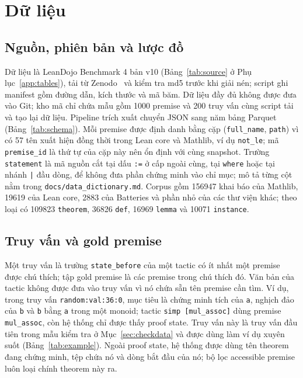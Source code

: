 \documentclass[11pt,a4paper,oneside]{report}
\newcommand{\code}[1]{\texttt{#1}}
\begin{document}
\chapter{Dữ liệu}\label{sec:data}

\section{Nguồn, phiên bản và lược đồ}

Dữ liệu là LeanDojo Benchmark 4 bản v10 (Bảng~\ref{tab:source} ở Phụ lục~\ref{app:tables}), tải từ
Zenodo~\cite{zenodo2024} và kiểm tra md5 trước khi giải nén; script ghi manifest gồm đường dẫn, kích thước và mã băm. Dữ
liệu đầy đủ không được đưa vào Git; kho mã chỉ chứa mẫu gồm \num{1000} premise và 200 truy vấn cùng script tải và tạo lại
dữ liệu. Pipeline trích xuất chuyển JSON sang năm bảng Parquet (Bảng~\ref{tab:schema}). Mỗi premise được định danh bằng cặp
(\code{full\_name}, \code{path}) vì có 57 tên xuất hiện đồng thời trong Lean core và Mathlib, ví dụ \code{not\_le}; mã
\code{premise\_id} là thứ tự của cặp này nên ổn định với cùng snapshot. Trường \code{statement} là mã nguồn cắt tại dấu
\code{:=} ở cấp ngoài cùng, tại \code{where} hoặc tại nhánh \code{|} đầu dòng, để không đưa phần chứng minh vào chỉ mục;
mô tả từng cột nằm trong \code{docs/data\_dictionary.md}. Corpus gồm \num{156947} khai báo của Mathlib, \num{19619} của Lean
core, \num{2883} của Batteries và phần nhỏ của các thư viện khác; theo loại có \num{109823} \code{theorem}, \num{36826}
\code{def}, \num{16969} \code{lemma} và \num{10071} \code{instance}.

\section{Truy vấn và gold premise}

Một truy vấn là trường \code{state\_before} của một tactic có ít nhất một premise được chú thích; tập gold premise là
các premise trong chú thích đó. Văn bản của tactic không được đưa vào truy vấn vì nó chứa sẵn tên premise cần tìm. Ví dụ,
trong truy vấn \code{random:val:36:0}, mục tiêu là chứng minh tích của \code{a}, nghịch đảo của \code{b} và \code{b} bằng
\code{a} trong một monoid; tactic \code{simp [mul\_assoc]} dùng premise \code{mul\_assoc}, còn hệ thống chỉ được thấy proof
state. Truy vấn này là truy vấn đầu tiên trong mẫu kiểm tra ở Mục~\ref{sec:checkdata} và được dùng làm ví dụ xuyên suốt
(Bảng~\ref{tab:example}). Ngoài proof state, hệ thống được dùng tên theorem đang chứng minh, tệp chứa nó và dòng bắt đầu
của nó; bộ lọc accessible premise luôn loại chính theorem này ra.
\end{document}

